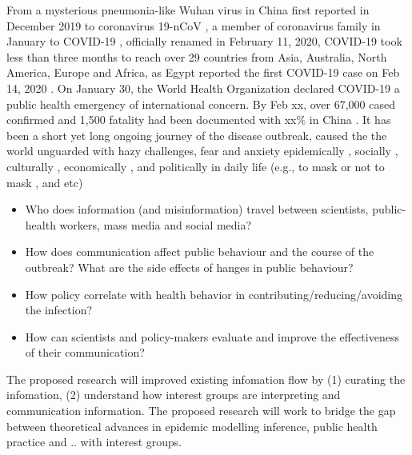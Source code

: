 
\proptitle{\fulltitle}


From a mysterious pneumonia-like Wuhan virus in China first reported in December 2019 to coronavirus 19-nCoV
, a member of coronavirus family \citep{} in January to COVID-19
, officially renamed in February 11, 2020,  COVID-19 took less than three months to reach over 29 countries from Asia, Australia, North America, Europe and Africa, as Egypt reported the first COVID-19 case on Feb 14, 2020 \citep{}.  
On January 30, the World Health Organization declared COVID-19 a public health emergency of international concern. By Feb xx, over 67,000 cased confirmed and  1,500 fatality had been documented with xx\% in China \citep{}.  
It has been a short yet long ongoing journey of the disease outbreak, caused the the world unguarded with hazy challenges, fear and anxiety epidemically \citep{}, socially \citep{} , culturally \citep{}, economically \citep{},  and politically \citep{} in daily life (e.g., to mask or not to mask 
, and etc)



\begin{itemize}
\item{Who does information (and misinformation) travel between scientists, public-health workers, mass media and social media?}
\item{How does communication affect public behaviour and the course of the outbreak? What are the side effects of hanges in public behaviour?}
\item{How policy correlate with health behavior in contributing/reducing/avoiding the infection?}
\item{How can scientists and policy-makers evaluate and improve the effectiveness of their communication?}
\end{itemize}

The proposed research will improved existing infomation flow by (1) curating the infomation, (2) understand how interest groups are interpreting and communication information. 
The proposed research will work to bridge the gap between theoretical advances in epidemic modelling inference, public health practice and .. with interest groups. 

